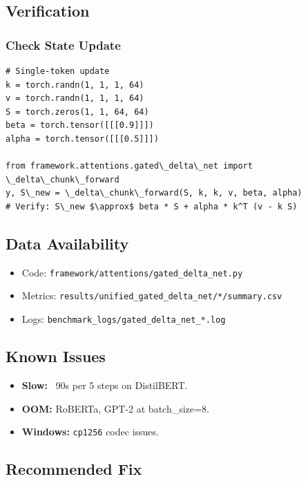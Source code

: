 \subsection{Verification}

\subsubsection{Check State Update}

\begin{lstlisting}
# Single-token update
k = torch.randn(1, 1, 1, 64)
v = torch.randn(1, 1, 1, 64)
S = torch.zeros(1, 1, 64, 64)
beta = torch.tensor([[[0.9]]])
alpha = torch.tensor([[[0.5]]])

from framework.attentions.gated\_delta\_net import \_delta\_chunk\_forward
y, S\_new = \_delta\_chunk\_forward(S, k, k, v, beta, alpha)
# Verify: S\_new $\approx$ beta * S + alpha * k^T (v - k S)
\end{lstlisting}

\subsection{Data Availability}

\begin{itemize}
\item Code: \texttt{framework/attentions/gated\_delta\_net.py}
\item Metrics: \texttt{results/unified\_gated\_delta\_net/*/summary.csv}
\item Logs: \texttt{benchmark\_logs/gated\_delta\_net\_*.log}

\end{itemize}
\subsection{Known Issues}

\begin{itemize}
\item \textbf{Slow:} ~90s per 5 steps on DistilBERT.
\item \textbf{OOM:} RoBERTa, GPT-2 at batch\_size=8.
\item \textbf{Windows:} \texttt{cp1256} codec issues.

\end{itemize}
\subsection{Recommended Fix}

